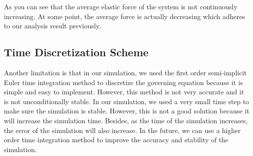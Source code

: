 \documentclass[acmtog]{acmart}
\begin{document}
As you can see that the average elastic force of the system is not continuously increasing. At some point, the average force is actually decreasing which adheres to our analysis result previously.

\subsection{Time Discretization Scheme}
Another limitation is that in our simulation, we used the first order semi-implicit Euler time integration method to discretize the governing equation because it is simple and easy to implement. However, this method is not very accurate and it is not unconditionally stable. In our simulation, we used a very small time step to make sure the simulation is stable. However, this is not a good solution because it will increase the simulation time. Besides, as the time of the simulation increases, the error of the simulation will also increase. In the future, we can use a higher order time integration method to improve the accuracy and stability of the simulation.
\end{document}

